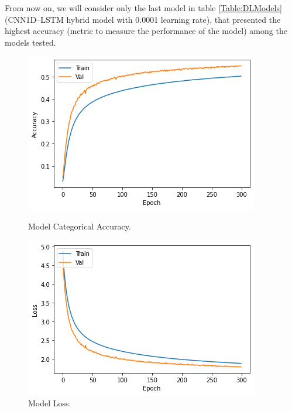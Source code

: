 From now on, we will consider only the last model in table \ref{Table:DLModels} (CNN1D--LSTM hybrid model with 0.0001 learning rate), that presented the highest accuracy (metric to measure the performance of the model) among the models tested. 

\begin{figure}[!tbp]
  \centering
  \begin{minipage}[b]{0.45\textwidth}
    \includegraphics[width=\textwidth]{../Figures/accuracy_model}
    \caption{Model Categorical Accuracy.}
    \label{Fig:Model_Cat_Acc}
  \end{minipage}
  \hfill
  \begin{minipage}[b]{0.45\textwidth}
    \includegraphics[width=\textwidth]{../Figures/loss_model}
    \caption{Model Loss.}
    \label{Fig:Model_Loss}
  \end{minipage}
\end{figure}

